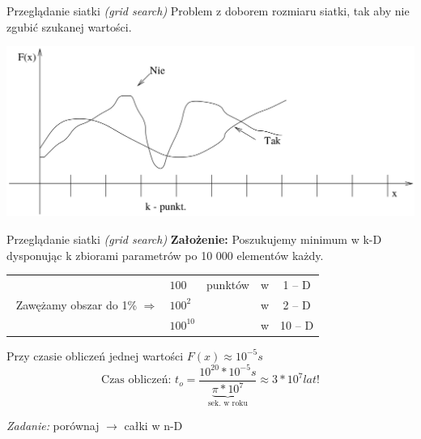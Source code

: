   \begin{frame}{Przeglądanie siatki \emph{(grid search)}}
    Problem z doborem rozmiaru siatki, tak aby nie zgubić szukanej wartości.

    \includegraphics[width=1\textwidth]{img/17/przegladanie_siatki}
  \end{frame}

  \begin{frame}{Przeglądanie siatki \emph{(grid search)}}
    \textbf{Założenie:} Poszukujemy minimum w k-D dysponując k zbiorami parametrów po 10 000 elementów każdy.

    \begin{tabular}{@{} c l c c c @{}}
      & $ 100 $ & punktów & w & 1 -- D \\
      $ $ Zawężamy obszar do 1\% $ \Rightarrow $ & $ 100^{2} $ & & w & 2 -- D \\
      & $ 100^{10} $ & & w & 10 -- D \\
    \end{tabular}

    Przy czasie obliczeń jednej wartości $F(x) \approx 10^{-5}s$
    \begin{displaymath}
      \text{Czas obliczeń: } t_o = \frac{10^{20}*10^{-5}s}{\underbrace{\pi * 10^{7}}_{\text{sek. w roku}}} \approx 3 * 10^{7}lat \text{!}
    \end{displaymath}
    \begin{flushright}
      \emph{Zadanie:} porównaj $\to$ całki w n-D
    \end{flushright}
  \end{frame}

